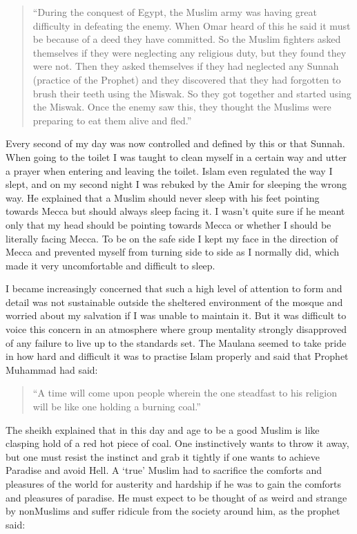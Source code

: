 \documentclass[12pt]{memoir}
\begin{document}
\begin{quote}
“During the conquest of Egypt,
the Muslim army was having great difficulty in defeating the enemy.
When Omar heard of this he said it must be
because of a deed they have committed.
So the Muslim fighters asked themselves
if they were neglecting any religious duty, but they found they were not.
Then they asked themselves if they had neglected any Sunnah
(practice of the Prophet) and they discovered
that they had forgotten to brush their teeth using the Miswak.
So they got together and started using the Miswak.
Once the enemy saw this,
they thought the Muslims were preparing to eat them alive and fled.”
\end{quote}

Every second of my day was now controlled and defined by this or that Sunnah.
When going to the toilet I was taught to clean myself in a certain way
and utter a prayer when entering and leaving the toilet.
Islam even regulated the way I slept,
and on my second night I was rebuked by the Amir for sleeping the wrong way.
He explained that a Muslim should never sleep with his feet pointing
towards Mecca but should always sleep facing it.
I wasn’t quite sure if he meant only that my head should be pointing
towards Mecca or whether I should be literally facing Mecca.
To be on the safe side I kept my face in the direction of Mecca
and prevented myself from turning side to side as I normally did,
which made it very uncomfortable and difficult to sleep.

I became increasingly concerned that such a high level of attention to form
and detail was not sustainable outside the sheltered environment of the mosque
and worried about my salvation if I was unable to maintain it.
But it was difficult to voice this concern in an atmosphere
where group mentality strongly disapproved of any failure
to live up to the standards set.
The Maulana seemed to take pride in how hard and difficult it was
to practise Islam properly and said that Prophet Muhammad had said:

\begin{quote}
“A time will come upon people wherein the one steadfast
to his religion will be like one holding a burning coal.”
\end{quote}

The sheikh explained that in this day and age to be a good Muslim
is like clasping hold of a red hot piece of coal.
One instinctively wants to throw it away,
but one must resist the instinct and grab it tightly
if one wants to achieve Paradise and avoid Hell.
A ‘true’ Muslim had to sacrifice the comforts
and pleasures of the world for austerity
and hardship if he was to gain the comforts and pleasures of paradise.
He must expect to be thought of as  weird
and strange by non\–Muslims and suffer ridicule from the society around him,
as the prophet said:
\end{document}
